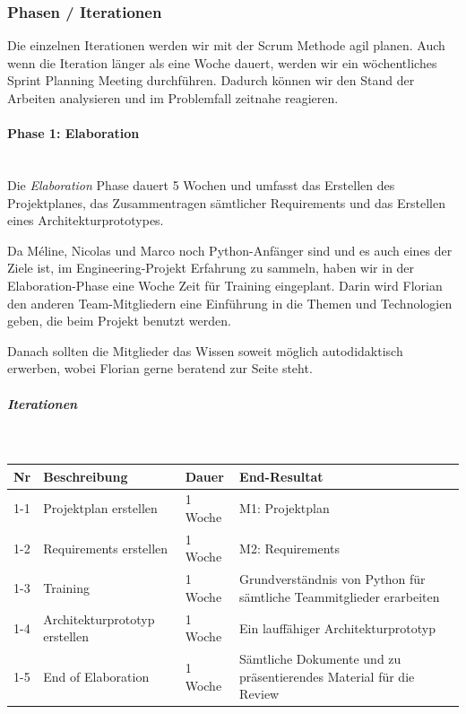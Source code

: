 \documentclass[a4paper]{article}
\begin{document}
\subsubsection{Phasen / Iterationen}

Die einzelnen Iterationen werden wir mit der Scrum Methode agil planen.
Auch wenn die Iteration länger als eine Woche dauert, werden wir ein wöchentliches Sprint Planning Meeting durchführen.
Dadurch können wir den Stand der Arbeiten analysieren und im Problemfall zeitnahe reagieren.

\paragraph{Phase 1: Elaboration} \strut \\[-1em]

Die \emph{Elaboration} Phase dauert 5 Wochen und umfasst das Erstellen des Projektplanes, das Zusammentragen sämtlicher Requirements und das Erstellen eines Architekturprototypes.

Da Méline, Nicolas und Marco noch Python-Anfänger sind und es auch eines der
Ziele ist, im Engineering-Projekt Erfahrung zu sammeln, haben wir in der Elaboration-Phase
eine Woche Zeit für Training eingeplant. Darin wird Florian den anderen Team-Mitgliedern eine
Einführung in die Themen und Technologien geben, die beim Projekt benutzt
werden.

Danach sollten die Mitglieder das Wissen soweit möglich autodidaktisch erwerben,
wobei Florian gerne beratend zur Seite steht.

\subparagraph{Iterationen} \strut \\[-1em]

\begin{tabular}{l>{\raggedright}p{10.6em}l>{\raggedright\arraybackslash}p{20em}}
  \toprule
  Nr & Beschreibung & Dauer & End-Resultat \\
  \midrule
  1-1 & Projektplan erstellen & 1 Woche & M1: Projektplan \\
  1-2 & Requirements erstellen & 1 Woche & M2: Requirements \\
  1-3 & Training & 1 Woche & Grundverständnis von Python für sämtliche Teammitglieder erarbeiten \\
  1-4 & Architekturprototyp erstellen & 1 Woche & Ein lauffähiger Architekturprototyp \\
  1-5 & End of Elaboration & 1 Woche & Sämtliche Dokumente und zu präsentierendes Material für die Review \\
  \bottomrule
\end{tabular}
\end{document}
